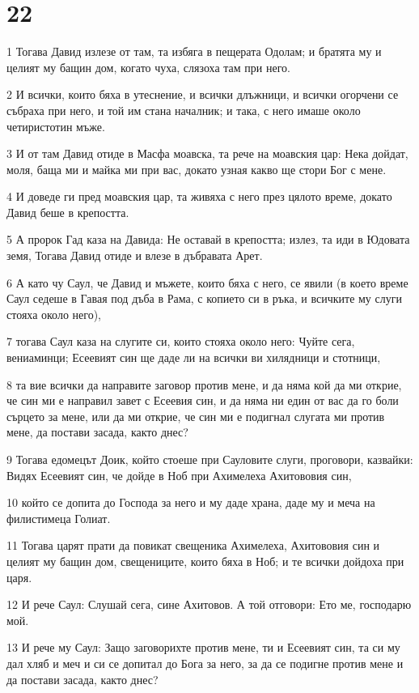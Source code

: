 \chapter{22}

\par 1 Тогава Давид излезе от там, та избяга в пещерата Одолам; и братята му и целият му бащин дом, когато чуха, слязоха там при него.
\par 2 И всички, които бяха в утеснение, и всички длъжници, и всички огорчени се събраха при него, и той им стана началник; и така, с него имаше около четиристотин мъже.
\par 3 И от там Давид отиде в Масфа моавска, та рече на моавския цар: Нека дойдат, моля, баща ми и майка ми при вас, докато узная какво ще стори Бог с мене.
\par 4 И доведе ги пред моавския цар, та живяха с него през цялото време, докато Давид беше в крепостта.
\par 5 А пророк Гад каза на Давида: Не оставай в крепостта; излез, та иди в Юдовата земя, Тогава Давид отиде и влезе в дъбравата Арет.
\par 6 А като чу Саул, че Давид и мъжете, които бяха с него, се явили (в което време Саул седеше в Гавая под дъба в Рама, с копието си в ръка, и всичките му слуги стояха около него),
\par 7 тогава Саул каза на слугите си, които стояха около него: Чуйте сега, вениаминци; Есеевият син ще даде ли на всички ви хилядници и стотници,
\par 8 та вие всички да направите заговор против мене, и да няма кой да ми открие, че син ми е направил завет с Есеевия син, и да няма ни един от вас да го боли сърцето за мене, или да ми открие, че син ми е подигнал слугата ми против мене, да постави засада, както днес?
\par 9 Тогава едомецът Доик, който стоеше при Сауловите слуги, проговори, казвайки: Видях Есеевият син, че дойде в Ноб при Ахимелеха Ахитововия син,
\par 10 който се допита до Господа за него и му даде храна, даде му и меча на филистимеца Голиат.
\par 11 Тогава царят прати да повикат свещеника Ахимелеха, Ахитововия син и целият му бащин дом, свещениците, които бяха в Ноб; и те всички дойдоха при царя.
\par 12 И рече Саул: Слушай сега, сине Ахитовов. А той отговори: Ето ме, господарю мой.
\par 13 И рече му Саул: Защо заговорихте против мене, ти и Есеевият син, та си му дал хляб и меч и си се допитал до Бога за него, за да се подигне против мене и да постави засада, както днес?
